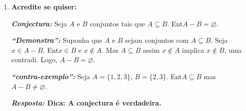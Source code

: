 \begin{enumerate}[{\bf 1.}]
\begin{enumerate}[a)]
\item $(A\subseteq C\ee B\subseteq C)\leftrightarrow A\uni B\subseteq C$.
\item $(A\subseteq C\ee B\subseteq D)\to(A\uni B\subseteq C\uni D)$.
\item $[(A\inter C=A\inter B)\ee(A\uni C=A\uni B)]\to B=C$.
\item $A\subseteq B\leftrightarrow A^C\uni B=\mathbb{U}$.
\item $A-B\subseteq B\leftrightarrow A\subseteq B$.

{\bf{\it Resposta:} Primeiro mostremos que ${\bf A-B\subseteq B\rightarrow A\subseteq B}$. De fato, suponha ${\bf A-B\subseteq B}$ e ${\bf A\not\subseteq B}$, ou seja, ${\bf \exists x\in A}$ tal que ${\bf x\notin B}$, portanto ${\bf x\in A-B}$, como ${\bf A-B\subseteq B}$, ent\ao ${\bf x\in B}$, contradi\caoi. Desejamos agora demonstrar que ${\bf A\subseteq B\rightarrow A-B\subseteq B}$. De fato, seja ${\bf x\in A-B}$, ent\ao ${\bf x\in A}$ e ${\bf x\notin B}$, mas como ${\bf A\subseteq B}$, ent\ao ${\bf x\in B}$, contradi\caoi. Logo, ${\bf A-B=\varnothing\subseteq B}$.}


\item $A\inter B=\mathbb{U}\leftrightarrow A=B=\mathbb{U}$.
\item $A\uni B\neq\varnothing\leftrightarrow A\neq\varnothing \ou B\neq\varnothing $.
\item $\mathbb{P}(A)=\mathbb{P}(B)\to A=B$.

{\bf{\it Resposta:} Se ${\bf A\neq B}$, ent\ao ${\bf \exists x\in A}$ tal que ${\bf x\notin B}$, logo ${\bf \{x\}\in \mathbb{P}(A)}$ e ${\bf \{x\}\notin \mathbb{P}(B)}$, logo ${\bf \mathbb{P}(A)\neq\mathbb{P}(B)}$.}
\end{enumerate}

\item {\bf Acredite se quiser:}  

\noindent \textit{\textbf{Conjectura:}} Seja $A$ e $B$ conjuntos tais que $A\subseteq B$. Ent\ao $A-B=\varnothing$.

\noindent \textit{\textbf{``Demonstra\caoi'':}} Suponha que $A$ e $B$ sejam conjuntos com $A\subseteq B$. Seja $x\in A-B$. Ent\ao $x\in B$ e $x\notin A$. Mas $A\subseteq B$ assim $x\notin A$ implica $x\notin B$, uma contradi\caoi. Logo, $A-B=\varnothing$.

\noindent \textit{\textbf{``contra-exemplo'':}} Seja $A=\{1,2,3\}$, $B=\{2,3\}$. Ent\ao $A\subseteq B$ mas $A-B\neq\varnothing$.

{\bf{\it Resposta:} Dica: A conjectura \'e verdadeira.}


\end{enumerate}
